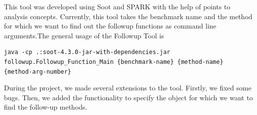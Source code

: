 This tool was developed using Soot and SPARK with the help of points to analysis concepts. Currently, this tool takes the benchmark name and the method for which we want to find out the followup functions as command line arguments.The general usage of the Followup Tool is 
\begin{lstlisting}[style = keywords]
java -cp .:soot-4.3.0-jar-with-dependencies.jar followup.Followup_Function_Main {benchmark-name} {method-name} {method-arg-number}
\end{lstlisting}

During the project, we made several extensions to the tool. Firstly, we fixed some bugs. Then, we added the functionality to specify the object for which we want to find the follow-up methods. 